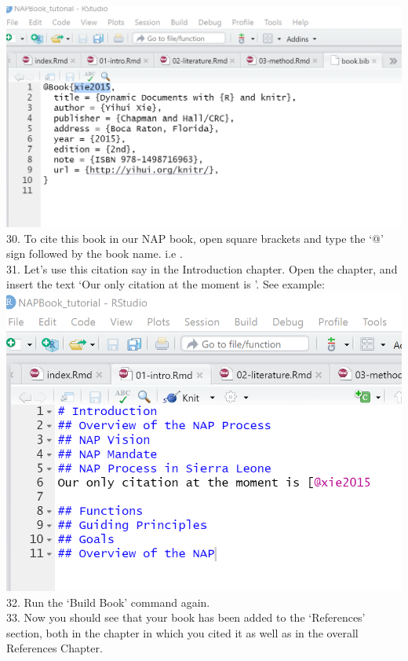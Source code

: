 \documentclass[
]{book}
\begin{document}
\includegraphics{tutorial_screenshots/add_citation.png}
30. To cite this book in our NAP book, open square brackets and type the `@' sign followed by the book name. i.e \citep{xie2015}.\\
31. Let's use this citation say in the Introduction chapter. Open the chapter, and insert the text `Our only citation at the moment is \citep{xie2015}'. See example:\\
\includegraphics{tutorial_screenshots/cite_book.png}
32. Run the `Build Book' command again.\\
33. Now you should see that your book has been added to the `References' section, both in the chapter in which you cited it as well as in the overall References Chapter.
\end{document}
